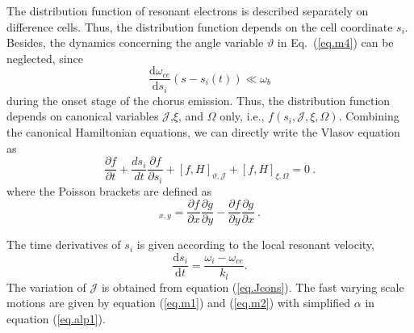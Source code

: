 The distribution function of resonant electrons is described separately on difference cells.
Thus, the distribution function depends on the cell coordinate $s_i$.
Besides, the dynamics concerning the angle variable $\vartheta$ in Eq.~(\ref{eq.m4}) can be neglected, since
\begin{equation}
   \frac{\mathrm{d} \omega_{ce}}{\mathrm{d} s_{i}}\left(s-s_{i}(t)\right) \ll \omega_b
\end{equation}
during the onset stage of the chorus emission.
Thus, the distribution function depends on canonical variables $\mathcal{J}$,$\xi$, and $\Omega$ only, i.e., $f(s_i,\mathcal{J},\xi,\Omega)$.
Combining the canonical Hamiltonian equations, we can directly write the Vlasov equation as 
\begin{equation}\label{eq.vlasov}
    \frac{\partial f}{\partial t}+ \frac{d s_{i}}{d t} \frac{\partial f}{\partial s_{i}}
+ \left[f, H\right]_{\vartheta,\mathcal{J}} +  \left[ f, H\right]_{\xi,\Omega}=0~.
\end{equation}
where the Poisson brackets are defined as
\begin{equation}
    [f,~g]_{x,y} = \frac{\partial f}{\partial x}\frac{\partial g}{\partial y}-\frac{\partial f}{\partial y}\frac{\partial g}{\partial x}~.
\end{equation}



The time derivatives of $s_i$ is given according to the local resonant velocity,
\begin{equation}
    \frac{\mathrm{d}s_i}{\mathrm{d}t} = \frac{\omega_i- \omega_{ce}}{k_l}.
\end{equation}
The variation of $\mathcal{J}$ is obtained from equation (\ref{eq.Jcons}).
The fast varying scale motions are given by equation (\ref{eq.m1}) and (\ref{eq.m2}) with simplified $\alpha$ in equation (\ref{eq.alp1}).


